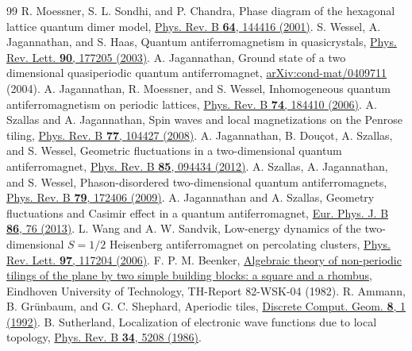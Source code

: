 \documentclass[aps,prb,twocolumn,superscriptaddress,floatfix]{revtex4-2}
\begin{document}
\begin{thebibliography}{99}
 R. Moessner, S. L. Sondhi, and P. Chandra, Phase diagram of the hexagonal lattice quantum dimer model, \href{https://doi.org/10.1103/PhysRevB.64.144416}{Phys. Rev. B \textbf{64}, 144416 (2001)}.
 S. Wessel, A. Jagannathan, and S. Haas, Quantum antiferromagnetism in quasicrystals, \href{https://doi.org/10.1103/PhysRevLett.90.177205}{Phys. Rev. Lett. \textbf{90}, 177205 (2003)}.
 A. Jagannathan, Ground state of a two dimensional quasiperiodic quantum antiferromagnet, \href{https://arxiv.org/abs/cond-mat/0409711}{arXiv:cond-mat/0409711} (2004).
 A. Jagannathan, R. Moessner, and S. Wessel, Inhomogeneous quantum antiferromagnetism on periodic lattices, \href{https://doi.org/10.1103/PhysRevB.74.184410}{Phys. Rev. B \textbf{74}, 184410 (2006)}.
 A. Szallas and A. Jagannathan, Spin waves and local magnetizations on the Penrose tiling, \href{https://doi.org/10.1103/PhysRevB.77.104427}{Phys. Rev. B \textbf{77}, 104427 (2008)}.
 A. Jagannathan, B. Dou\c{c}ot, A. Szallas, and S. Wessel, Geometric fluctuations in a two-dimensional quantum antiferromagnet, \href{https://doi.org/10.1103/PhysRevB.85.094434}{Phys. Rev. B \textbf{85}, 094434 (2012)}.
 A. Szallas, A. Jagannathan, and S. Wessel, Phason-disordered two-dimensional quantum antiferromagnets, \href{https://doi.org/10.1103/PhysRevB.79.172406}{Phys. Rev. B \textbf{79}, 172406 (2009)}.
 A. Jagannathan and A. Szallas, Geometry fluctuations and Casimir effect in a quantum antiferromagnet, \href{https://doi.org/10.1140/epjb/e2012-31033-y}{Eur. Phys. J. B \textbf{86}, 76 (2013)}.
 L. Wang and A. W. Sandvik, Low-energy dynamics of the two-dimensional $S=1/2$ Heisenberg antiferromagnet on percolating clusters, \href{https://doi.org/10.1103/PhysRevLett.97.117204}{Phys. Rev. Lett. \textbf{97}, 117204 (2006)}.
 F. P. M. Beenker, \href{https://research.tue.nl/en/studentTheses/algebraic-theory-of-non-periodic-tilings-on-the-plane-by-two-simp/}{Algebraic theory of non-periodic tilings of the plane by two simple building blocks: a square and a rhombus}, Eindhoven University of Technology, TH-Report 82-WSK-04 (1982).
 R. Ammann, B. Gr\"unbaum, and G. C. Shephard, Aperiodic tiles, \href{https://doi.org/10.1007/BF02293033}{Discrete Comput. Geom. \textbf{8}, 1 (1992)}.
 B. Sutherland, Localization of electronic wave functions due to local topology, \href{https://doi.org/10.1103/PhysRevB.34.5208}{Phys. Rev. B \textbf{34}, 5208 (1986)}.

\end{thebibliography}
\end{document}
